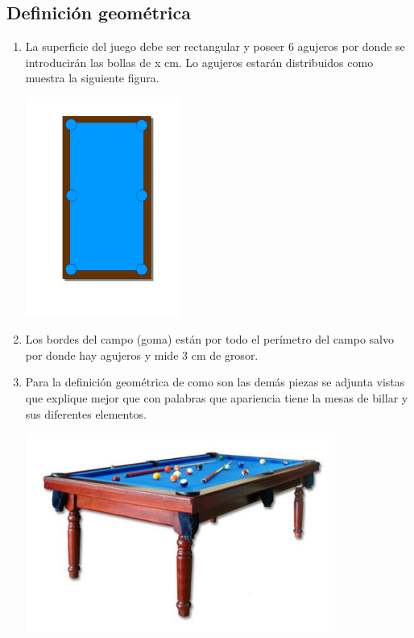 	\subsection {Definición geométrica}
		    \begin{enumerate}
		     \item La superficie del juego debe ser rectangular y poseer 6 agujeros por donde se introducirán las bollas de x cm. Lo  agujeros estarán distribuidos como
			    muestra la siguiente figura.
		  \begin{center}
    			\includegraphics[width=0.4\textwidth]{billar.png}
		\end{center}


		     \item Los bordes del campo (goma) están por todo el perímetro del campo salvo por donde hay agujeros y mide  3 cm de grosor.

		     \item Para la definición geométrica de como son las demás piezas  se adjunta vistas que explique mejor que con palabras que apariencia tiene la mesas de billar
			  y sus diferentes elementos.
		\begin{center}
    			\includegraphics[width=0.8\textwidth]{donbillar.png}
		\end{center}	
		    \end{enumerate}


